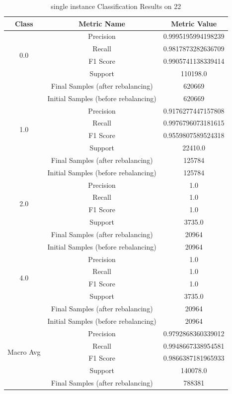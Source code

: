 \begin{longtable}{|c|c|c|}
\caption{single instance Classification Results on 22} \label{tab:22_single_instance_classifiers_results} \\
\hline
Class & Metric Name & Metric Value \\
\hline
\multirow{4}{*}{0.0} & Precision & 0.9995195994198239 \\
 & Recall & 0.9817873282636709 \\
 & F1 Score & 0.9905741138339414 \\
 & Support & 110198.0 \\
 & Final Samples (after rebalancing) & 620669 \\
 & Initial Samples (before rebalancing) & 620669 \\
\hline
\multirow{4}{*}{1.0} & Precision & 0.9176277447157808 \\
 & Recall & 0.9976796073181615 \\
 & F1 Score & 0.9559807589524318 \\
 & Support & 22410.0 \\
 & Final Samples (after rebalancing) & 125784 \\
 & Initial Samples (before rebalancing) & 125784 \\
\hline
\multirow{4}{*}{2.0} & Precision & 1.0 \\
 & Recall & 1.0 \\
 & F1 Score & 1.0 \\
 & Support & 3735.0 \\
 & Final Samples (after rebalancing) & 20964 \\
 & Initial Samples (before rebalancing) & 20964 \\
\hline
\multirow{4}{*}{4.0} & Precision & 1.0 \\
 & Recall & 1.0 \\
 & F1 Score & 1.0 \\
 & Support & 3735.0 \\
 & Final Samples (after rebalancing) & 20964 \\
 & Initial Samples (before rebalancing) & 20964 \\
\hline
\multirow{4}{*}{Macro Avg} & Precision & 0.9792868360339012 \\
 & Recall & 0.9948667338954581 \\
 & F1 Score & 0.9866387181965933 \\
 & Support & 140078.0 \\
 & Final Samples (after rebalancing) & 788381 \\

\end{longtable}
